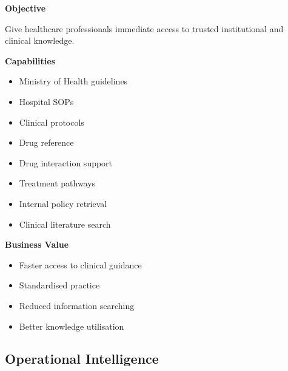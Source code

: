 \begin{capability}

\textbf{Objective}

Give healthcare professionals immediate access to trusted institutional and clinical knowledge.

\vspace{3mm}

\textbf{Capabilities}

\begin{itemize}

\item Ministry of Health guidelines

\item Hospital SOPs

\item Clinical protocols

\item Drug reference

\item Drug interaction support

\item Treatment pathways

\item Internal policy retrieval

\item Clinical literature search

\end{itemize}

\vspace{3mm}

\textbf{Business Value}

\begin{itemize}

\item Faster access to clinical guidance

\item Standardised practice

\item Reduced information searching

\item Better knowledge utilisation

\end{itemize}

\end{capability}


\subsection{Operational Intelligence}

